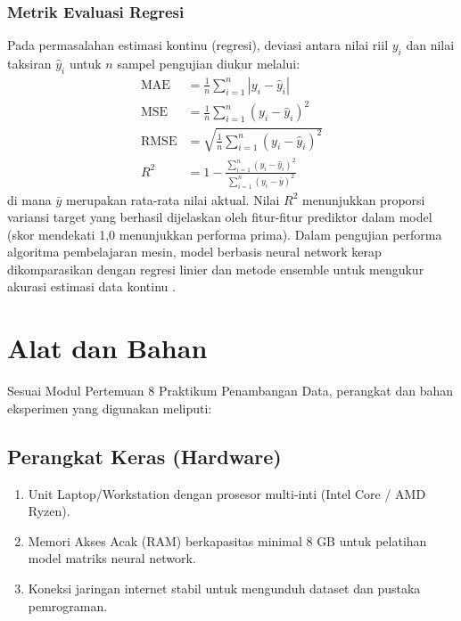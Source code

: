 \documentclass[a4paper,oneside,12pt]{report}
\begin{document}
\subsection{Metrik Evaluasi Regresi}
Pada permasalahan estimasi kontinu (regresi), deviasi antara nilai riil $y_i$ dan nilai taksiran $\hat{y}_i$ untuk $n$ sampel pengujian diukur melalui:
\begin{align}
	\text{MAE}  & = \frac{1}{n} \sum_{i=1}^n |y_i - \hat{y}_i|                                  \\
	\text{MSE}  & = \frac{1}{n} \sum_{i=1}^n (y_i - \hat{y}_i)^2                                \\
	\text{RMSE} & = \sqrt{\frac{1}{n} \sum_{i=1}^n (y_i - \hat{y}_i)^2}                         \\
	R^2         & = 1 - \frac{\sum_{i=1}^n (y_i - \hat{y}_i)^2}{\sum_{i=1}^n (y_i - \bar{y})^2}
\end{align}
di mana $\bar{y}$ merupakan rata-rata nilai aktual. Nilai $R^2$ menunjukkan proporsi variansi target yang berhasil dijelaskan oleh fitur-fitur prediktor dalam model (skor mendekati 1,0 menunjukkan performa prima). Dalam pengujian performa algoritma pembelajaran mesin, model berbasis neural network kerap dikomparasikan dengan regresi linier dan metode ensemble untuk mengukur akurasi estimasi data kontinu \cite{mardiani2023}.

\clearpage

\chapter{Alat dan Bahan}

Sesuai Modul Pertemuan 8 Praktikum Penambangan Data, perangkat dan bahan eksperimen yang digunakan meliputi:

\section{Perangkat Keras (Hardware)}
\begin{enumerate}[noitemsep, topsep=2pt, parsep=1pt]
	\item Unit Laptop/Workstation dengan prosesor multi-inti (Intel Core / AMD Ryzen).
	\item Memori Akses Acak (RAM) berkapasitas minimal 8 GB untuk pelatihan model matriks neural network.
	\item Koneksi jaringan internet stabil untuk mengunduh dataset dan pustaka pemrograman.
\end{enumerate}
\end{document}
